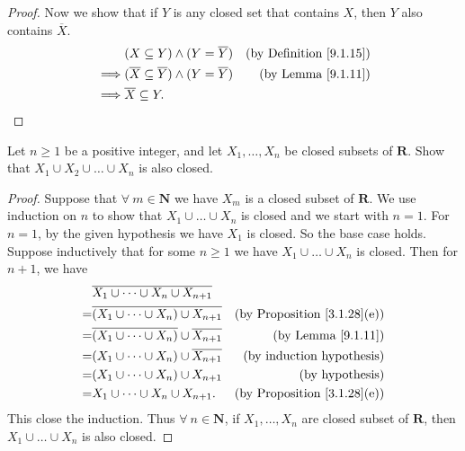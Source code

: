 \begin{proof}
    Now we show that if \(Y\) is any closed set that contains \(X\), then \(Y\) also contains \(\overline{X}\).
    \begin{align*}
                 & (X \subseteq Y) \land (Y = \overline{Y})                       & \text{(by Definition \ref{9.1.15})} \\
        \implies & (\overline{X} \subseteq \overline{Y}) \land (Y = \overline{Y}) & \text{(by Lemma \ref{9.1.11})}      \\
        \implies & \overline{X} \subseteq Y.
    \end{align*}
\end{proof}

\begin{exercise}\label{ex 9.1.7}
    Let \(n \geq 1\) be a positive integer, and let \(X_1, \dots, X_n\) be closed subsets of \(\mathbf{R}\).
    Show that \(X_1 \cup X_2 \cup \dots \cup X_n\) is also closed.
\end{exercise}

\begin{proof}
    Suppose that \(\forall\ m \in \mathbf{N}\) we have \(X_m\) is a closed subset of \(\mathbf{R}\).
    We use induction on \(n\) to show that \(X_1 \cup \dots \cup X_n\) is closed and we start with \(n = 1\).
    For \(n = 1\), by the given hypothesis we have \(X_1\) is closed.
    So the base case holds.
    Suppose inductively that for some \(n \geq 1\) we have \(X_1 \cup \dots \cup X_n\) is closed.
    Then for \(n + 1\), we have
    \begin{align*}
          & \overline{X_1 \cup \dots \cup X_n \cup X_{n + 1}}                                                        \\
        = & \overline{(X_1 \cup \dots \cup X_n) \cup X_{n + 1}}            & \text{(by Proposition \ref{3.1.28}(e))} \\
        = & \overline{(X_1 \cup \dots \cup X_n)} \cup \overline{X_{n + 1}} & \text{(by Lemma \ref{9.1.11})}          \\
        = & (X_1 \cup \dots \cup X_n) \cup \overline{X_{n + 1}}            & \text{(by induction hypothesis)}        \\
        = & (X_1 \cup \dots \cup X_n) \cup X_{n + 1}                       & \text{(by hypothesis)}                  \\
        = & X_1 \cup \dots \cup X_n \cup X_{n + 1}.                        & \text{(by Proposition \ref{3.1.28}(e))}
    \end{align*}
    This close the induction.
    Thus \(\forall\ n \in \mathbf{N}\), if \(X_1, \dots, X_n\) are closed subset of \(\mathbf{R}\), then \(X_1 \cup \dots \cup X_n\) is also closed.
\end{proof}

